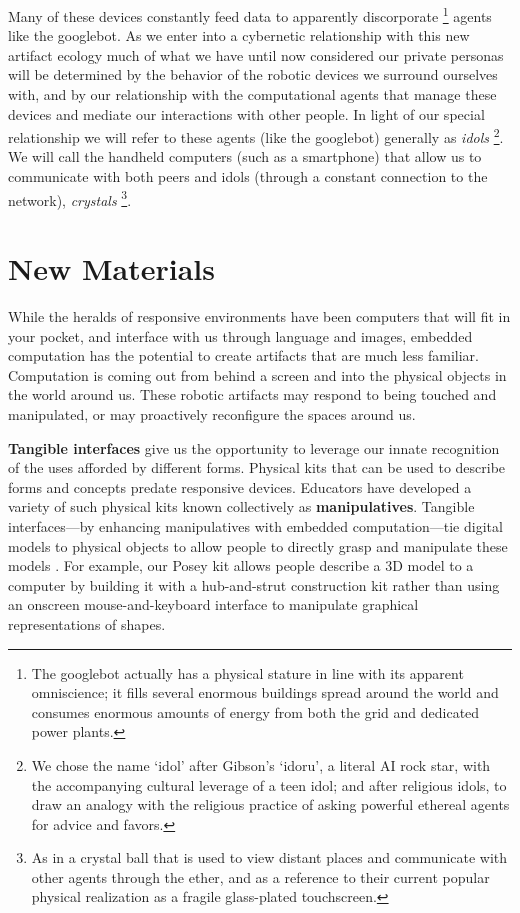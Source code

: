 Many of these devices constantly feed data to apparently discorporate%
\footnote{The googlebot actually has a physical stature in line with its apparent omniscience; it fills several enormous buildings spread around the world and consumes enormous amounts of energy from both the grid and dedicated power plants.}
agents like the googlebot.
As we enter into a cybernetic relationship with this new artifact ecology much of what we have until now considered our private personas will be determined by the behavior of the robotic devices we surround ourselves with, and by our relationship with the computational agents that manage these devices and mediate our interactions with other people. 
In light of our special relationship we will refer to these agents (like the googlebot) generally as \emph{idols}%
\footnote{We chose the name `idol' after Gibson's `idoru'\citeyearpar{gibson_idoru}, a literal AI rock star, with the accompanying cultural leverage of a teen idol; and after religious idols, to draw an analogy with the religious practice of asking powerful ethereal agents for advice and favors.}.
We will call the handheld computers (such as a smartphone) that allow us to communicate with both peers and idols (through a constant connection to the network), \emph{crystals}%
\footnote{As in a crystal ball that is used to view distant places and communicate with other agents through the ether, and as a reference to their current popular physical realization as a fragile glass-plated touchscreen.}.

\section{New Materials}
%
While the heralds of responsive environments have been computers that will fit in your pocket, and interface with us through language and images, embedded computation has the potential to create artifacts that are much less familiar.
Computation is coming out from behind a screen and into the physical objects in the world around us. These robotic artifacts may respond to being touched and manipulated, or may proactively reconfigure the spaces around us.

\textbf{Tangible interfaces} give us the opportunity to leverage our innate recognition of the uses afforded by different forms. 
Physical kits that can be used to describe forms and concepts predate responsive devices. Educators have developed a variety of such physical kits known collectively as \textbf{manipulatives}. 
Tangible interfaces---by enhancing manipulatives with embedded computation---tie digital models to physical objects to allow people to directly grasp and manipulate these models \citep{tangible_bits}.
For example, our Posey kit allows people describe a 3D model to a computer by building it with a hub-and-strut construction kit rather than using an onscreen mouse-and-keyboard interface to manipulate graphical representations of shapes.

